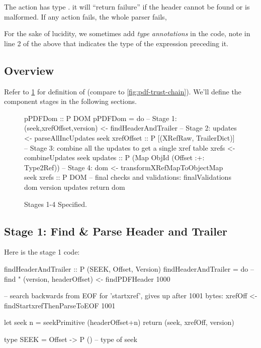 
The action  has type .
it will ``return failure'' if the header cannot be found or is malformed.
If any action fails, the whole parser fails,

For the sake of lucidity, we sometimes add \emph{type annotations} in
the code, note in line 2 of the above that 
indicates the type of the expression preceding it.

\subsection{Overview}

Refer to \cref{fig:spec} for definition of  (compare to \cref{fig:pdf-trust-chain}).
We'll define the component stages in the following sections.

\begin{figure}[t]
\centering
\begin{code}
pPDFDom :: P DOM
pPDFDom =
    do
    -- Stage 1:
    (seek,xrefOffset,version) <- findHeaderAndTrailer
    -- Stage 2:
    updates <- parseAllIncUpdates seek xrefOffset
               :: P [(XRefRaw, TrailerDict)]
    -- Stage 3: combine all the updates to get a single xref table
    xrefs <- combineUpdates seek updates
             :: P (Map ObjId (Offset :+: Type2Ref))
    -- Stage 4:
    dom <- transformXRefMapToObjectMap seek xrefs
           :: P DOM
    -- final checks and validations:
    finalValidations dom version updates
    return dom
\end{code}
\caption{Stages 1-4 Specified.}
\label{fig:spec}
\end{figure}


\subsection{Stage 1: Find \& Parse Header and Trailer}

Here is the stage 1 code:
\begin{code}
findHeaderAndTrailer :: P (SEEK, Offset, Version)
findHeaderAndTrailer =
    do
    -- find "%
    (version, headerOffset) <- findPDFHeader 1000

    -- search backwards from EOF for 'startxref', gives up after 1001 bytes:
    xrefOff <- findStartxrefThenParseToEOF 1001
    
    let seek n = seekPrimitive (headerOffset+n)
    return (seek, xrefOff, version)
    
type SEEK = Offset -> P () -- type of seek
\end{code}

